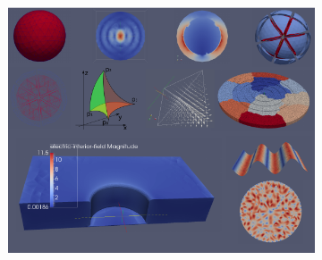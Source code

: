 \documentclass[a4paper,11pt]{article}
\begin{document}
\begin{figure}[H]
    \centering
	\begin{subfigure}[b]{\textwidth} \hspace{4mm} \includegraphics[scale=1.5]{images/frontpage} \end{subfigure}
    

\end{figure}
\end{document}
